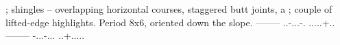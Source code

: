 ; shingles -- overlapping horizontal courses, staggered butt joints, a
; couple of lifted-edge highlights. Period 8x6, oriented down the slope.
--------
..-...-.
.....+..
--------
-...-...
..+.....
